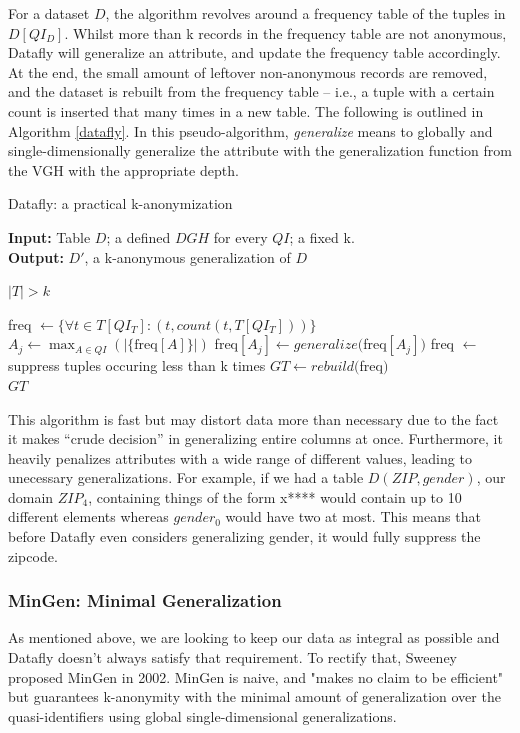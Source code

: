 For a dataset $D$, the algorithm revolves around a frequency table of the tuples in $D[QI_D]$. Whilst more than k records in the frequency table are not anonymous, Datafly will generalize an attribute, and update the frequency table accordingly. At the end, the small amount of leftover non-anonymous records are removed, and the dataset is rebuilt from the frequency table -- i.e., a tuple with a certain count is inserted that many times in a new table. The following is outlined in Algorithm \ref{datafly}. In this pseudo-algorithm, \textit{generalize} means to globally and single-dimensionally generalize the attribute with the generalization function from the VGH with the appropriate depth.
\begin{algorithm}
\caption{Datafly: a practical k-anonymization}
\label{datafly}
\textbf{Input:} Table $D$; a defined $DGH$ for every $QI$; a fixed k. \\
\textbf{Output:} $D'$, a k-anonymous generalization of $D$
\begin{algorithmic} %
    \Ensure $|T| > k$
    
    \State freq $\leftarrow \{\forall t \in T[QI_T]: (t, count(t, T[QI_T]))\}$     
        \State $A_j \leftarrow \max_{A \in QI}(|\{\mbox{freq}[A]\}|)$ 
        \State freq$[A_j] \leftarrow generalize($freq$[A_j])$
    \EndWhile
    \State freq $\leftarrow$ suppress tuples occuring less than k times
    \State $GT \leftarrow rebuild($freq$)$ \\
    \Return $GT$
    
\end{algorithmic}
\end{algorithm}

This algorithm is fast but may distort data more than necessary due to the fact it makes ``crude decision'' in generalizing entire columns at once. Furthermore, it heavily penalizes attributes with a wide range of different values, leading to unecessary generalizations. For example, if we had a table $D(ZIP, gender)$, our domain $ZIP_4$, containing things of the form x**** would contain up to 10 different elements whereas $gender_0$ would have two at most. This means that before Datafly even considers generalizing gender, it would fully suppress the zipcode.


\subsubsection{MinGen: Minimal Generalization}
\label{mingen}
As mentioned above, we are looking to keep our data as integral as possible and Datafly doesn't always satisfy that requirement. To rectify that, Sweeney proposed MinGen in 2002\cite{kanon_algos}. MinGen is naive, and "makes no claim to be efficient" but guarantees k-anonymity with the minimal amount of generalization over the quasi-identifiers using global single-dimensional generalizations. 

